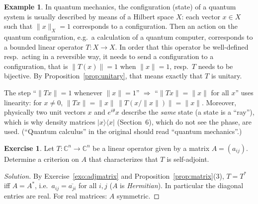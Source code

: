 \documentclass[11pt,a4paper]{article}
\numberwithin{equation}{section}
\newcommand{\C}{\mathbb{C}}
\newcommand{\ketbra}[2]{|#1\rangle\langle #2|}
\newcommand{\conj}[1]{\overline{#1}}
\theoremstyle{plain}
\theoremstyle{definition}
\newtheorem{example}[theorem]{Example}
\newtheorem{exercise}[theorem]{Exercise}
\theoremstyle{plain}
\theoremstyle{definition}
\newenvironment{solution}{\begin{proof}[Solution]}{\end{proof}}
\begin{document}
\begin{example}
In quantum mechanics, the configuration (state) of a quantum system is usually described by
means of a Hilbert space $X$: each vector $x\in X$ such that $\|x\|_X=1$ corresponds to a
configuration. Then an action on the quantum configuration, e.g.\ a calculation of a
quantum computer, corresponds to a bounded linear operator $T:X\to X$. In order that this
operator be well-defined resp.\ acting in a reversible way, it needs to send a configuration
to a configuration, that is $\|T(x)\|=1$ when $\|x\|=1$, resp.\ $T$ needs to be bijective.
By Proposition~\ref{prop:unitary}, that means exactly that $T$ is unitary.
\end{example}

\begin{addition}[(Example~4.7)]
The step ``$\|Tx\|=1$ whenever $\|x\|=1$'' $\Rightarrow$ ``$\|Tx\|=\|x\|$ for all $x$''
uses linearity: for $x\ne0$, $\|Tx\|=\|x\|\,\|T(x/\|x\|)\|=\|x\|$. Moreover, physically two
unit vectors $x$ and $e^{i\theta}x$ describe the \emph{same} state (a state is a ``ray''),
which is why density matrices $\ketbra{x}{x}$ (Section~6), which do not see the phase,
are used. (``Quantum calculus'' in the original should read ``quantum mechanics''.)
\end{addition}

\begin{exercise}
Let $T:\C^n\to\C^n$ be a linear operator given by a matrix $A=(a_{ij})$. Determine a
criterion on $A$ that characterizes that $T$ is self-adjoint.
\end{exercise}
\begin{solution}
By Exercise~\ref{exo:adjmatrix} and Proposition~\ref{prop:matrix}(3), $T=T^*$ iff $A=A^*$,
i.e.\ $a_{ij}=\conj{a_{ji}}$ for all $i,j$ ($A$ is \emph{Hermitian}). In particular the
diagonal entries are real. For real matrices: $A$ symmetric.
\end{solution}
\end{document}
